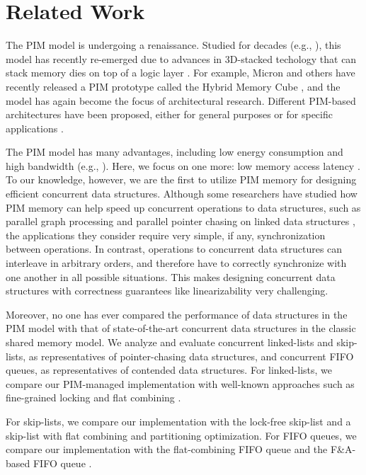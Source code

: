 \section{Related Work}
\label{section:related_work}
The PIM model is undergoing a renaissance. 
Studied for decades 
(e.g., \cite{Stone1970, Kogge1994, Gokhale1995, Patterson1997, Oskin1998, KangHYKGLTP99, Hall1999}), 
this model has recently re-emerged due to advances in 3D-stacked techology that 
can stack memory dies on top of a logic layer \cite{jeddeloh2012, Loh2008, Black2006, Kim2014HotChip}. 
For example, Micron and others have recently released a PIM prototype called 
the Hybrid Memory Cube \cite{website:HMC}, and the model has again become the focus of architectural research.
Different PIM-based architectures have been proposed, either for general purposes or for 
specific applications \cite{Ahn2015:1, Ahn2015:2, Zhang2014:TTP, hsieh2016accelerating,
Azarkhish16, Akin2015:DRM, Azarkhish2015, AzarkhishPRLB17, boroumand2016, ZhuASSHPF13, ZhuGSPF13}.

The PIM model has many advantages, including low energy consumption and high bandwidth 
(e.g., \cite{Ahn2015:2, Zhang2014:TTP, ZhuASSHPF13, AzarkhishPRLB17}). 
Here, we focus on one more: low memory access latency 
\cite{Loh2008, hsieh2016accelerating, Azarkhish16}.
To our knowledge, however, we are the first to utilize PIM memory for designing efficient 
concurrent data structures. 
Although some researchers have studied how PIM memory can help speed up concurrent 
operations to data structures, such as parallel graph processing \cite{Ahn2015:2} and  
parallel pointer chasing on linked data structures \cite{hsieh2016accelerating}, 
the applications they consider require very simple, if any, synchronization between operations. 
In contrast, operations to concurrent data structures can interleave in arbitrary orders, 
and therefore have to correctly synchronize with one another in all possible situations. 
This makes designing concurrent data structures with correctness guarantees like 
linearizability \cite{Herlihy90} very challenging. 

Moreover, no one has ever compared the performance of data structures in the PIM model 
with that of state-of-the-art concurrent data structures in the classic shared memory model. 
We analyze and evaluate concurrent linked-lists and skip-lists, 
as representatives of pointer-chasing data structures, and concurrent FIFO queues, 
as representatives of contended data structures.
For linked-lists, we compare our PIM-managed implementation with well-known approaches 
such as fine-grained locking \cite{Heller05} and flat combining 
\cite{Hendler10, Fatourou12, Hendler:2010:DISC}.

For skip-lists, we compare our implementation with the lock-free skip-list \cite{Herlihy08} 
and a skip-list with flat combining and partitioning optimization. 
For FIFO queues, we compare our implementation with the flat-combining FIFO queue 
\cite{Hendler10} and the F\&A-based FIFO queue \cite{Morrison13}. 